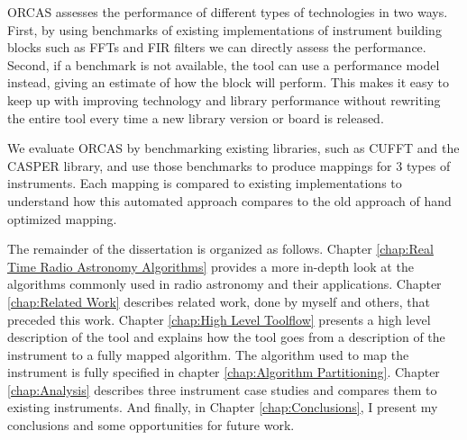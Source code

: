 ORCAS assesses the performance of different types of technologies in two ways.
First, by using benchmarks of existing implementations of instrument building blocks such as FFTs and FIR filters we can directly assess the performance.
Second, if a benchmark is not available, the tool can use a performance model instead, giving an estimate of how the block will perform.
This makes it easy to keep up with improving technology and library performance without rewriting the entire tool every time a new library version or board is released. 

We evaluate ORCAS by benchmarking existing libraries, such as CUFFT and the CASPER library, and use those benchmarks to produce mappings for 3 types of instruments.
Each mapping is compared to existing implementations to understand how this automated approach compares to the old approach of hand optimized mapping.

The remainder of the dissertation is organized as follows.
Chapter \ref{chap:Real Time Radio Astronomy Algorithms} provides a more in-depth look at the algorithms commonly used in radio astronomy and their applications.
Chapter \ref{chap:Related Work} describes related work, done by myself and others, that preceded this work.
Chapter \ref{chap:High Level Toolflow} presents a high level description of the tool and explains how the tool goes from a description of the instrument to a fully mapped algorithm.
The algorithm used to map the instrument is fully specified in chapter \ref{chap:Algorithm Partitioning}.
Chapter \ref{chap:Analysis} describes three instrument case studies and compares them to existing instruments. 
And finally, in Chapter \ref{chap:Conclusions}, I present my conclusions and some opportunities for future work.






